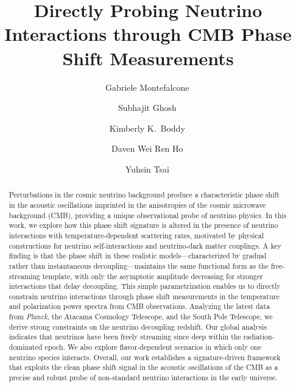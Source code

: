 \documentclass[aps,prd,twocolumn,showpacs,superscriptaddress,nofootinbib,preprintnumbers]{revtex4-2}
\newcommand{\detailtexcount}[1]{%
  \immediate\write18{texcount -merge -sum -q #1.tex output.bbl > #1.wcdetail }%
}
\begin{document}

\title{Directly Probing Neutrino Interactions through CMB Phase Shift Measurements}
\author{Gabriele Montefalcone\,}

\author{Subhajit Ghosh\,}

\author{Kimberly K.~Boddy\,}

\author{Daven Wei Ren Ho\,}

\author{Yuhsin Tsai\,}
 
\begin{abstract}
Perturbations in the cosmic neutrino background produce a characteristic phase shift in the acoustic oscillations imprinted in the anisotropies of the cosmic microwave background (CMB), providing a unique observational probe of neutrino physics. In this work, we explore how this phase shift signature is altered in the presence of neutrino interactions with temperature-dependent scattering rates, motivated by physical constructions for neutrino self-interactions and neutrino-dark matter couplings. A key finding is that the phase shift in these realistic models---characterized by gradual rather than instantaneous decoupling---maintains the same functional form as the free-streaming template, with only the asymptotic amplitude decreasing for stronger interactions that delay decoupling. This simple parametrization enables us to directly constrain neutrino interactions through phase shift measurements in the temperature and polarization power spectra from CMB observations. Analyzing the latest data from \textit{Planck}, the Atacama Cosmology Telescope, and the South Pole Telescope, we derive strong constraints on the neutrino decoupling redshift. Our global analysis indicates that neutrinos have been freely streaming since deep within the radiation-dominated epoch. We also explore flavor-dependent scenarios in which only one neutrino species interacts. Overall, our work establishes a signature-driven framework that exploits the clean phase shift signal in the acoustic oscillations of the CMB as a precise and robust probe of non-standard neutrino interactions in the early universe.
\end{abstract}
 
\end{document}
